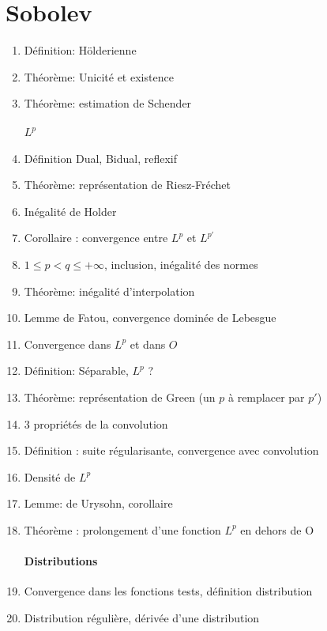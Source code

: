 \documentclass{article}
\begin{document}
\part{Sobolev}
\begin{enumerate}
\section{Rappels}
	\item Définition: Hölderienne
	\item Théorème: Unicité et existence
	\item Théorème: estimation de Schender
\subsection{$L^p$}
	\item Définition Dual, Bidual, reflexif
	\item Théorème: représentation de Riesz-Fréchet
	\item Inégalité de Holder
	\item Corollaire : convergence entre $L^p$ et $L^{p'}$
	\item $1 \leq p<q\leq +\infty$, inclusion, inégalité des normes
	\item Théorème: inégalité d’interpolation
	\item Lemme de Fatou, convergence dominée de Lebesgue
	\item Convergence dans $L^p$ et dans $O$
	\item Définition: Séparable, $L^p$ ?
	\item Théorème: représentation de Green (un $p$ à remplacer par $p'$)
	\item 3 propriétés de la convolution
	\item Définition : suite régularisante, convergence avec convolution
	\item Densité de $L^p$
	\item Lemme: de Urysohn, corollaire
	\item Théorème : prolongement d'une fonction $L^p$ en dehors de O
\subsection{Distributions}
	\item Convergence dans les fonctions tests, définition distribution
	\item Distribution régulière, dérivée d'une distribution

\end{enumerate}
\end{document}
